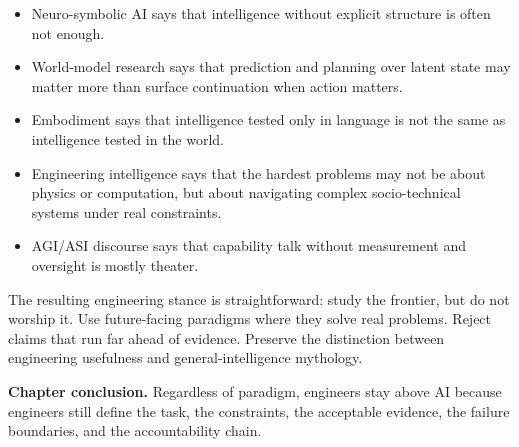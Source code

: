\documentclass[12pt]{article}
\begin{document}
\begin{itemize}
    \item Neuro-symbolic AI says that intelligence without explicit structure is often not enough.
    \item World-model research says that prediction and planning over latent state may matter more than surface continuation when action matters.
    \item Embodiment says that intelligence tested only in language is not the same as intelligence tested in the world.
    \item Engineering intelligence says that the hardest problems may not be about physics or computation, but about navigating complex socio-technical systems under real constraints.
    \item AGI/ASI discourse says that capability talk without measurement and oversight is mostly theater.
\end{itemize}

The resulting engineering stance is straightforward: study the frontier, but do not worship it. Use future-facing paradigms where they solve real problems. Reject claims that run far ahead of evidence. Preserve the distinction between engineering usefulness and general-intelligence mythology.

\begin{alert-box}
\textbf{Chapter conclusion.} Regardless of paradigm, engineers stay above AI because engineers still define the task, the constraints, the acceptable evidence, the failure boundaries, and the accountability chain.
\end{alert-box}



\end{document}
